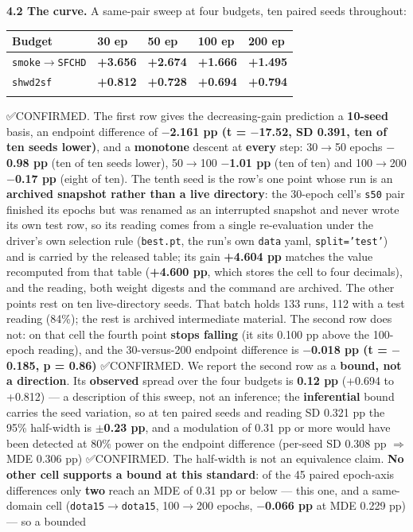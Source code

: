 \documentclass[pdflatex,sn-mathphys-ay]{sn-jnl}
\begin{document}
\textbf{4.2 The curve.} A same-pair sweep at four budgets, ten paired seeds throughout:

\begin{center}
{\small
\begin{tabular}{lllll}
\toprule
Budget & 30 ep & 50 ep & 100 ep & 200 ep \\
\midrule
\texttt{smoke\ensuremath{\rightarrow}SFCHD} & \textbf{+3.656} & \textbf{+2.674} & \textbf{+1.666} & \textbf{+1.495} \\
\texttt{shwd2sf} & \textbf{+0.812} & \textbf{+0.728} & \textbf{+0.694} & \textbf{+0.794} \\
\botrule
\end{tabular}}
\end{center}

✅CONFIRMED. The first row gives the decreasing-gain prediction a \textbf{10-seed} basis, an endpoint difference of \textbf{\ensuremath{-}2.161 pp (t = \ensuremath{-}17.52, SD 0.391, ten of ten seeds lower)}, and a \textbf{monotone} descent at \textbf{every} step: 30\ensuremath{\rightarrow}50 epochs \textbf{\ensuremath{-}0.98 pp} (ten of ten seeds lower), 50\ensuremath{\rightarrow}100 \textbf{\ensuremath{-}1.01 pp} (ten of ten) and 100\ensuremath{\rightarrow}200 \textbf{\ensuremath{-}0.17 pp} (eight of ten). The tenth seed is the row's one point whose run is an \textbf{archived snapshot rather than a live directory}: the 30-epoch cell's \texttt{s50} pair finished its epochs but was renamed as an interrupted snapshot and never wrote its own test row, so its reading comes from a single re-evaluation under the driver's own selection rule (\texttt{best.pt}, the run's own \texttt{data} yaml, \texttt{split='test'}) and is carried by the released table; its gain \textbf{+4.604 pp} matches the value recomputed from that table (\textbf{+4.600 pp}, which stores the cell to four decimals), and the reading, both weight digests and the command are archived. The other points rest on ten live-directory seeds. That batch holds 133 runs, 112 with a test reading (84\%); the rest is archived intermediate material. The second row does not: on that cell the fourth point \textbf{stops falling} (it sits 0.100 pp above the 100-epoch reading), and the 30-versus-200 endpoint difference is \textbf{\ensuremath{-}0.018 pp (t = \ensuremath{-}0.185, p = 0.86)} ✅CONFIRMED. We report the second row as a \textbf{bound, not a direction}. Its \textbf{observed} spread over the four budgets is \textbf{0.12 pp} (+0.694 to +0.812) --- a description of this sweep, not an inference; the \textbf{inferential} bound carries the seed variation, so at ten paired seeds and reading SD 0.321 pp the 95\% half-width is \textbf{\ensuremath{\pm}0.23 pp}, and a modulation of 0.31 pp or more would have been detected at 80\% power on the endpoint difference (per-seed SD 0.308 pp \ensuremath{\Rightarrow} MDE 0.306 pp) ✅CONFIRMED. The half-width is not an equivalence claim. \textbf{No other cell supports a bound at this standard}: of the 45 paired epoch-axis differences only \textbf{two} reach an MDE of 0.31 pp or below --- this one, and a same-domain cell (\texttt{dota15\ensuremath{\rightarrow}dota15}, 100\ensuremath{\rightarrow}200 epochs, \textbf{\ensuremath{-}0.066 pp} at MDE 0.229 pp) --- so a bounded 
\end{document}

